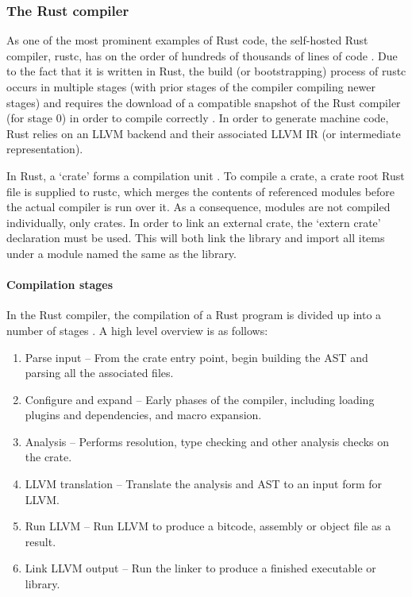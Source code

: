 
\subsubsection{The Rust compiler}
As one of the most prominent examples of Rust code, the self-hosted Rust compiler, rustc, has on the order of hundreds of thousands of lines of code \cite{openhub15}. Due to the fact that it is written in Rust, the build (or bootstrapping) process of rustc occurs in multiple stages (with prior stages of the compiler compiling newer stages) and requires the download of a compatible snapshot of the Rust compiler (for stage 0) in order to compile correctly \cite{makefile15}. In order to generate machine code, Rust relies on an LLVM backend and their associated LLVM IR (or intermediate representation).

In Rust, a `crate' forms a compilation unit \cite{examplecrates15}. To compile a crate, a crate root Rust file is supplied to rustc, which merges the contents of referenced modules before the actual compiler is run over it. As a consequence, modules are not compiled individually, only crates. In order to link an external crate, the `extern crate' declaration must be used. This will both link the library and import all items under a module named the same as the library. 

\paragraph{Compilation stages}
In the Rust compiler, the compilation of a Rust program is divided up into a number of stages \cite{driver15}. A high level overview is as follows:

\begin{enumerate}
\item Parse input -- From the crate entry point, begin building the AST and parsing all the associated files.
\item Configure and expand -- Early phases of the compiler, including loading plugins and dependencies, and macro expansion.
\item Analysis -- Performs resolution, type checking and other analysis checks on the crate.
\item LLVM translation -- Translate the analysis and AST to an input form for LLVM.
\item Run LLVM -- Run LLVM to produce a bitcode, assembly or object file as a result.
\item Link LLVM output -- Run the linker to produce a finished executable or library.
\end{enumerate}

